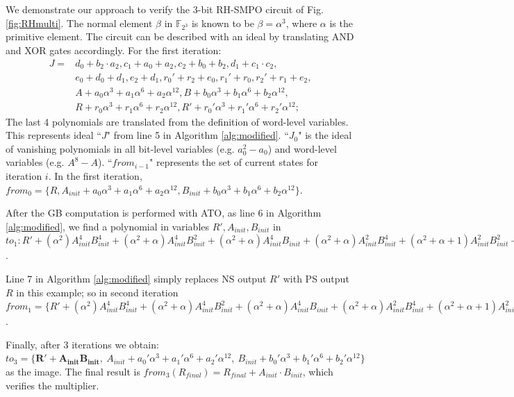 \begin{Example}
\label{ex:RHSMPO}

We demonstrate our approach to verify the 3-bit RH-SMPO circuit of
Fig.\ref{fig:RHmulti}. The normal element $\beta$ in
$\mathbb{F}_{2^3}$ is known to be $\beta = \alpha^3$, where $\alpha$
is the primitive element. The circuit can be described with an ideal by translating
AND and XOR gates accordingly. For the first iteration:
\begin{align*}
J = &d_0+b_2\cdot a_2,
c_1+a_0+a_2,
c_2+b_0+b_2,
d_1+c_1\cdot c_2,\\
&e_0+d_0+d_1,
e_2+d_1,
r_0'+r_2+e_0,
r_1'+r_0,
r_2'+r_1+e_2,\\
&A+a_0\alpha^3+a_1\alpha^6+a_2\alpha^{12},
B+b_0\alpha^3+b_1\alpha^6+b_2\alpha^{12},\\
&R+r_0\alpha^3+r_1\alpha^6+r_2\alpha^{12},
R'+r_0'\alpha^3+r_1'\alpha^6+r_2'\alpha^{12};
\end{align*}
The last 4 polynomials are translated from the definition of word-level variables.
This represents ideal ``$J$" from line 5 in Algorithm
\ref{alg:modified}. ``$J_0$" is the ideal of vanishing polynomials in all bit-level
variables (e.g. $a_0^2-a_0$) and word-level variables (e.g. $A^8-A$). ``$from_{i-1}$"
represents the set of current states for iteration $i$.
In the first iteration, $from_0 = \{R, A_{init}+a_0\alpha^3+a_1\alpha^6+a_2\alpha^{12},
B_{init}+b_0\alpha^3+b_1\alpha^6+b_2\alpha^{12}\}$.

After the GB computation is performed with ATO, as line 6 in Algorithm \ref{alg:modified},
we find a polynomial in variables $R', A_{init}, B_{init}$ in $to_1 : 
R'+(\alpha^2) A_{init}^4 B_{init}^4+(\alpha^2+\alpha) A_{init}^4 B_{init}^2+(\alpha^2+\alpha) A_{init}^4 B_{init}+(\alpha^2+\alpha) A_{init}^2 B_{init}^4+(\alpha^2+\alpha+1) A_{init}^2 B_{init}^2+(\alpha^2) A_{init}^2 B_{init}+(\alpha^2+\alpha) A_{init} B_{init}^4+(\alpha^2) A_{init} B_{init}^2
$.

Line 7 in Algorithm \ref{alg:modified} simply replaces NS output $R'$ with PS output
$R$ in this example; so in second iteration $from_1 = \{
R'+(\alpha^2) A_{init}^4 B_{init}^4+(\alpha^2+\alpha) A_{init}^4 B_{init}^2+(\alpha^2+\alpha) A_{init}^4 B_{init}+(\alpha^2+\alpha) A_{init}^2 B_{init}^4+(\alpha^2+\alpha+1) A_{init}^2 B_{init}^2+(\alpha^2) A_{init}^2 B_{init}+(\alpha^2+\alpha) A_{init} B_{init}^4+(\alpha^2) A_{init} B_{init}^2
, A_{init}+a_2\alpha^3+a_0\alpha^6+a_1\alpha^{12},
B_{init}+b_2\alpha^3+b_0\alpha^6+b_1\alpha^{12}\}$. 

Finally, after 3 iterations we obtain: $to_3 = \{ \mathbf{R'+A_{init}B_{init},}
~A_{init}+a_0'\alpha^3+a_1'\alpha^6+a_2'\alpha^{12},
~B_{init}+b_0'\alpha^3+b_1'\alpha^6+b_2'\alpha^{12}\}$
as the image. The final result is $from_3(R_{final}) = R_{final}+A_{init}\cdot
B_{init}$, which verifies the multiplier. 
\end{Example}

